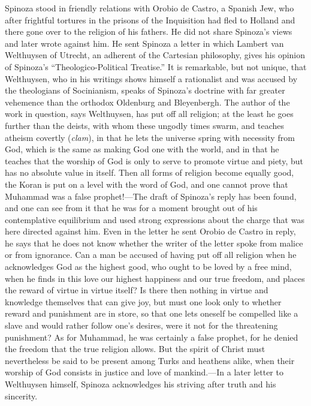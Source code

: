 \documentclass[12pt]{book}
\newcommand{\opage}[1]{\marginnote{\footnotesize\textit{[#1]}}}
\begin{document}
Spinoza stood in friendly relations with Orobio de Castro, a Spanish Jew, who after
frightful tortures in the prisons of the Inquisition had fled to Holland and there gone
over to the religion of his fathers. He did not share Spinoza's views and later wrote
against him. He sent Spinoza a letter in which Lambert van Welthuysen of Utrecht, an
adherent of the Cartesian philosophy, gives his opinion of Spinoza's
``Theologico-Political Treatise.'' It is remarkable, but not unique, that Welthuysen,
who in his writings shows himself a rationalist and was accused by the theologians of
Socinianism, speaks of Spinoza's doctrine with far greater vehemence than the orthodox
Oldenburg and Bleyenbergh. The author of the work in question, says Welthuysen, has put
off all religion; at the least he goes further than the deists, with whom these ungodly
times swarm, and teaches atheism covertly (\textit{clam}), in that he lets the universe
spring with necessity from God, which is the same as making God one with the world,
and in that he teaches that the worship of God is only to serve to promote virtue and
\opage{55}piety, but has no absolute value in itself. Then all forms of religion become
equally good, the Koran is put on a level with the word of God, and one cannot prove
that Muhammad was a false prophet!---The draft of Spinoza's reply has been found, and
one can see from it that he was for a moment brought out of his contemplative
equilibrium and used strong expressions about the charge that was here directed against
him. Even in the letter he sent Orobio de Castro in reply, he says that he does not know
whether the writer of the letter spoke from malice or from ignorance. Can a man be
accused of having put off all religion when he acknowledges God as the highest good,
who ought to be loved by a free mind, when he finds in this love our highest happiness
and our true freedom, and places the reward of virtue in virtue itself? Is there then
nothing in virtue and knowledge themselves that can give joy, but must one look only to
whether reward and punishment are in store, so that one lets oneself be compelled like
a slave and would rather follow one's desires, were it not for the threatening
punishment? As for Muhammad, he was certainly a false prophet, for he denied the freedom
that the true religion allows. But the spirit of Christ must nevertheless be said to be
present among Turks and heathens alike, when their worship of God consists in justice
and love of mankind.---In a later letter to Welthuysen himself, Spinoza acknowledges his
striving after truth and his sincerity.
\end{document}
